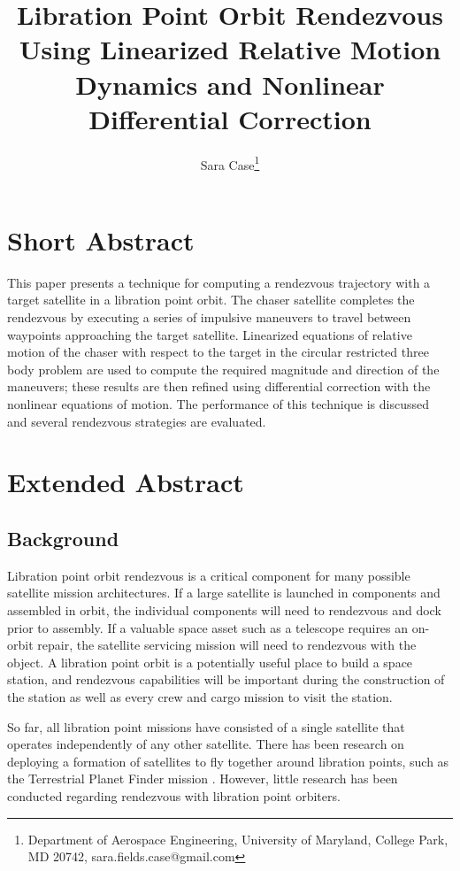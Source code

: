 \documentclass[a4paper]{article}
\title{Libration Point Orbit Rendezvous Using Linearized Relative Motion Dynamics and Nonlinear Differential Correction}
\author{Sara Case\thanks{Department of Aerospace Engineering, University of Maryland, College Park, MD 20742, sara.fields.case@gmail.com}}
\date{}
\begin{document}
\maketitle


\section*{Short Abstract}

This paper presents a technique for computing a rendezvous trajectory with a target satellite in a libration point orbit.  The chaser satellite completes the rendezvous by executing a series of impulsive maneuvers to travel between waypoints approaching the target satellite.  Linearized equations of relative motion of the chaser with respect to the target in the circular restricted three body problem are used to compute the required magnitude and direction of the maneuvers; these results are then refined using differential correction with the nonlinear equations of motion. The performance of this technique is discussed and several rendezvous strategies are evaluated.

\section*{Extended Abstract}

\subsection*{Background}

Libration point orbit rendezvous is a critical component for many possible satellite mission architectures.  If a large satellite is launched in components and assembled in orbit, the individual components will need to rendezvous and dock prior to assembly.  If a valuable space asset such as a telescope requires an on-orbit repair, the satellite servicing mission will need to rendezvous with the object.  A libration point orbit is a potentially useful place to build a space station, and rendezvous capabilities will be important during the construction of the station as well as every crew and cargo mission to visit the station.

So far, all libration point missions have consisted of a single satellite that operates independently of any other satellite.  There has been research on deploying a formation of satellites to fly together around libration points, such as the Terrestrial Planet Finder mission \cite{beichman2004}.  However, little research has been conducted regarding rendezvous with libration point orbiters.
\end{document}
